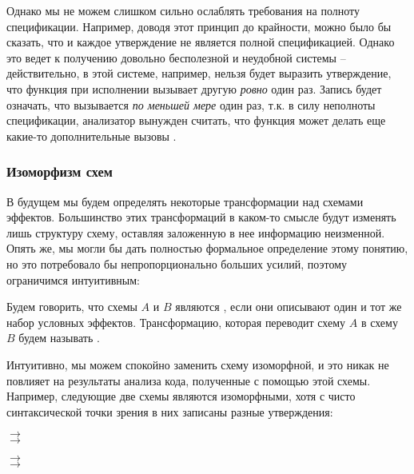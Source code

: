 Однако мы не можем слишком сильно ослаблять требования на полноту спецификации. Например, доводя этот принцип до крайности, можно было бы сказать, что и каждое утверждение не является полной спецификацией. Однако это ведет к получению довольно бесполезной и неудобной системы -- действительно, в этой системе, например, нельзя будет выразить утверждение, что функция при исполнении вызывает другую \emph{ровно} один раз. Запись  будет означать, что  вызывается \emph{по меньшей мере} один раз, т.к. в силу неполноты спецификации, анализатор вынужден считать, что функция может делать еще какие-то дополнительные вызовы .




\subsubsection{Изоморфизм схем}

В будущем мы будем определять некоторые трансформации над схемами эффектов. Большинство этих трансформаций в каком-то смысле будут изменять лишь структуру схему, оставляя заложенную в нее информацию неизменной. Опять же, мы могли бы дать полностью формальное определение этому понятию, но это потребовало бы непропорционально больших усилий, поэтому ограничимся интуитивным:

\begin{definition}
    Будем говорить, что схемы $A$ и $B$ являются , если они описывают один и тот же набор условных эффектов. Трансформацию, которая переводит схему $A$ в схему $B$ будем называть .
\end{definition}

Интуитивно, мы можем спокойно заменить схему изоморфной, и это никак не повлияет на результаты анализа кода, полученные с помощью этой схемы. Например, следующие две схемы являются изоморфными, хотя с чисто синтаксической точки зрения в них записаны разные утверждения:

{
       $\rightarrow$  \\
     $\rightarrow$  \\
}{}

\bigskip

{
     $\rightarrow$  \\
       $\rightarrow$ 
}
{}



